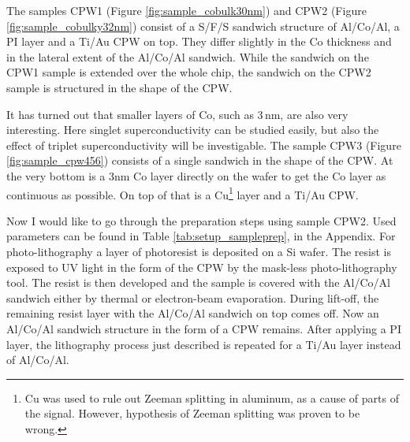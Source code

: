 The samples CPW1 (Figure \ref{fig:sample_cobulk30nm}) and CPW2 (Figure \ref{fig:sample_cobulky32nm}) consist of a S/F/S sandwich structure of Al/Co/Al, a PI layer and a Ti/Au CPW on top. They differ slightly in the Co thickness and in the lateral extent of the Al/Co/Al sandwich. While the sandwich on the CPW1 sample is extended over the whole chip, the sandwich on the CPW2 sample is structured in the shape of the CPW.

It has turned out that smaller layers of Co, such as $3\,$nm, are also very interesting. Here singlet superconductivity can be studied easily, but also the effect of triplet superconductivity will be investigable. The sample CPW3 (Figure \ref{fig:sample_cpw456}) consists of a single sandwich in the shape of the CPW. At the very bottom is a 3nm Co layer directly on the wafer to get the Co layer as continuous as possible. On top of that is a Cu\footnote{Cu was used to rule out Zeeman splitting in aluminum, as a cause of parts of the signal. However, hypothesis of Zeeman splitting was proven to be wrong.} layer and a Ti/Au CPW.

Now I would like to go through the preparation steps using sample CPW2. Used parameters can be found in Table \ref{tab:setup_sampleprep}, in the Appendix. For photo-lithography a layer of photoresist is deposited on a Si wafer. The resist is exposed to UV light in the form of the CPW by the mask-less photo-lithography tool. The resist is then developed and the sample is covered with the Al/Co/Al sandwich either by thermal or electron-beam evaporation. During lift-off, the remaining resist layer with the Al/Co/Al sandwich on top comes off. Now an Al/Co/Al sandwich structure in the form of a CPW remains. After applying a PI layer, the lithography process just described is repeated for a Ti/Au layer instead of Al/Co/Al. 
